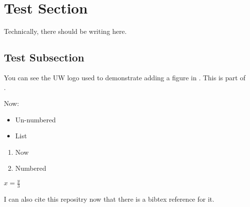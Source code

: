 
\section{Test Section}

Technically, there should be writing here.

\subsection{Test Subsection}\label{mysectionlabel}

You can see the UW logo used to demonstrate adding a figure in . This is part of .


Now:

\begin{itemize}
    \item Un-numbered
    \item List
\end{itemize}

\begin{enumerate}
    \item Now
    \item Numbered
\end{enumerate}

\begin{center}
    $x = \frac{y}{3}$
\end{center}


I can also cite this repositry \cite{this_repository} now that there is a bibtex reference for it.

